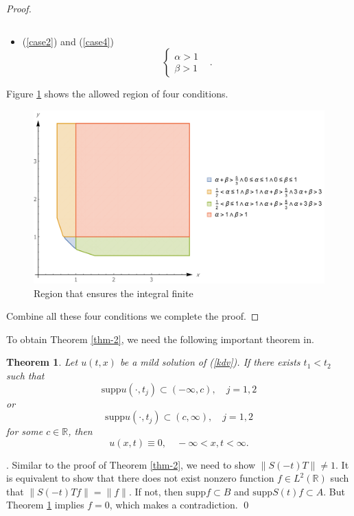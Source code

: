\documentclass[12pt]{amsart}
\def\R {\mathbb{R}}
\newtheorem{theorem}[proposition]{Theorem}
\theoremstyle{definition}
\numberwithin{equation}{section}
\begin{document}
\begin{proof}
\begin{itemize}
\begin{equation}
       \end{equation}
       \item (\ref{case2}) and (\ref{case4})
       \begin{equation}
          \begin{cases}
             \alpha>1 &\\
             \beta>1 &
          \end{cases}.
       \end{equation}
    \end{itemize}
    Figure \ref{fig1} shows the allowed region of four conditions.
 \begin{figure}[ht]
    \includegraphics[width=14cm]{range.pdf}
    \centering
    \caption{Region that ensures the integral finite}
    \label{fig1}
    \end{figure}
    Combine all these four conditions we complete the proof.
 \end{proof}
To obtain Theorem \ref{thm-2}, we need the following important theorem in\cite[p.~60]{12}.
\begin{theorem}\label{thm-3}
    Let $u(t,x)$ be a mild solution of (\ref{kdv}). If there exists $t_1<t_2$ such that 
    \begin{equation}
        \mathrm{supp}u(\cdot, t_j)\subset (-\infty,c),\quad j=1,2
    \end{equation} 
    or 
    \begin{equation}
        \mathrm{supp}u(\cdot,t_j)\subset (c,\infty),\quad j=1,2
    \end{equation}
    for some $c\in \R$, then 
    $$
        u(x,t)\equiv 0,\quad -\infty <x,t<\infty.
    $$
\end{theorem}

. Similar to the proof of Theorem \ref{thm-2}, we need to show $\|S(-t)T\|\neq 1$. It is equivalent to show that there does not exist nonzero function $f\in L^2(\R)$ such that $\| S(-t)Tf\|=\|f\|$. If not, then $\mathrm{supp}f\subset B$ and $\mathrm{supp}S(t)f\subset A$. But Theorem  \ref{thm-3} implies $f=0$, which makes a contradiction. \qed    
 
\end{document}
